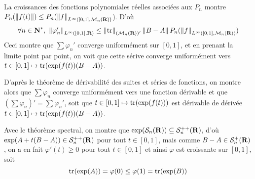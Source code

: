 \begin{correction}
\begin{enumerate}
		La croissances des fonctions polynomiales réelles associées aux $P_n$ montre $P_n({\left\lVert f(t)\right\rVert})\leq P_n(\left\lVert f\right\rVert_{L^{\infty}([0,1],\mathcal M_n(\operatorname{\mathbf{R}}))}$).
		D'où 
		\[
			\forall n\in\N^*,\ \norm{\varphi'_n}_{L^\infty([0,1],\R)}\leq \norm{\tr}_{(\mathcal M_n(\R))'}\norm{B-A}P_n(\norm{f}_{L^{\infty}([0,1],\mathcal M_n(\R))})
		\]
		Ceci montre que $\sum\varphi_n'$ converge uniformément sur $[0,1]$, et en prenant la limite point par point,
		on voit que cette sérive converge uniformément vers $t\in[0,1]\mapsto\operatorname{tr}(\exp(f(t))(B-A))$.

		D'après le théorème de dérivabilité des suites et séries de fonctions, on montre alors que $\sum\varphi_n$ converge uniformément vers une fonction dérivable 
		et que $(\sum\varphi_n)'=\sum\varphi_n'$, soit que $t\in[0,1]\mapsto\operatorname{tr}(\exp(f(t)))$ est dérivable de dérivée $t\in[0,1]\mapsto \operatorname{tr}(\exp(f(t))(B-A))$.

		Avec le théorème spectral, on montre que $\exp(\mathcal S_n(\operatorname{\mathbf{R}}))\subseteq \mathcal S_n^{++}(\operatorname{\mathbf{R}})$, d'où $\exp(A+t(B-A))\in\mathcal S_n^{++}(\operatorname{\mathbf{R}})$ pour tout $t\in[0,1]$,
		mais comme $B-A\in\mathcal S_n^+(\operatorname{\mathbf{R}})$, on a en fait $\varphi'(t)\geq 0$ pour tout $t\in[0,1]$ et ainsi $\varphi$ est croissante sur $[0,1]$, soit 
		\[
			\operatorname{tr}(\exp(A))=\varphi(0)\leq\varphi(1)=\operatorname{tr}(\exp(B))	
		\]
	\end{enumerate}
\end{correction}
